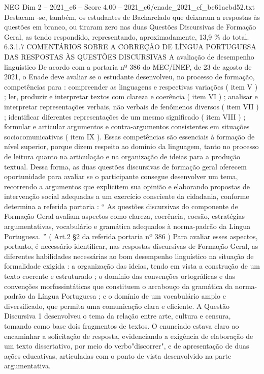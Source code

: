 \begin{textsample}{NEG Dim 2 – 2021\_c6 – Score 4.00 – 2021\_c6/enade\_2021\_ef\_be61acbd52.txt}
Destacam -se, também, os estudantes de Bacharelado que deixaram a respostas às questões em branco, ou tiraram zero nas duas Questões Discursivas de Formação Geral, as tendo respondido, representando, aproximadamente, 13,9 \% do total. 6.3.1.7 COMENTÁRIOS SOBRE A CORREÇÃO DE LÍNGUA PORTUGUESA DAS RESPOSTAS ÀS QUESTÕES DISCURSIVAS A avaliação de desempenho linguístico De acordo com a portaria nº 386 do MEC/INEP, de 23 de agosto de 2021, o Enade deve avaliar se o estudante desenvolveu, no processo de formação, competências para : compreender as linguagens e respectivas variações ( item V ) ; ler, produzir e interpretar textos com clareza e coerência ( item VI ) ; analisar e interpretar representações verbais, não verbais de fenômenos diversos ( item VII ) ; identificar diferentes representações de um mesmo significado ( item VIII ) ; formular e articular argumentos e contra-argumentos consistentes em situações sociocomunicativas ( item IX ).
Essas competências são essenciais à formação de nível superior, porque dizem respeito ao domínio da linguagem, tanto no processo de leitura quanto na articulação e na organização de ideias para a produção textual.
Dessa forma, as duas questões discursivas de formação geral oferecem oportunidade para avaliar se o participante consegue desenvolver um tema, recorrendo a argumentos que explicitem sua opinião e elaborando propostas de intervenção social adequadas a um exercício consciente da cidadania, conforme determina a referida portaria : “ As questões discursivas do componente de Formação Geral avaliam aspectos como clareza, coerência, coesão, estratégias argumentativas, vocabulário e gramática adequados à norma-padrão da Língua Portuguesa. ” ( Art.2 §2 da referida portaria nº 386 ) Para avaliar esses aspectos, portanto, é necessário identificar, nas respostas discursivas de Formação Geral, as diferentes habilidades necessárias ao bom desempenho linguístico na situação de formalidade exigida : a organização das ideias, tendo em vista a construção de um texto coerente e estruturado ; o domínio das convenções ortográficas e das convenções morfossintáticas que constituem o arcabouço da gramática da norma-padrão da Língua Portuguesa ; e o domínio de um vocabulário amplo e diversificado, que permita uma comunicação clara e eficiente.
A Questão Discursiva 1 desenvolveu o tema da relação entre arte, cultura e censura, tomando como base dois fragmentos de textos.
O enunciado estava claro ao encaminhar a solicitação de resposta, evidenciando a exigência de elaboração de um texto dissertativo, por meio do verbo"discorrer", e de apresentação de duas ações educativas, articuladas com o ponto de vista desenvolvido na parte argumentativa.

\end{textsample}
